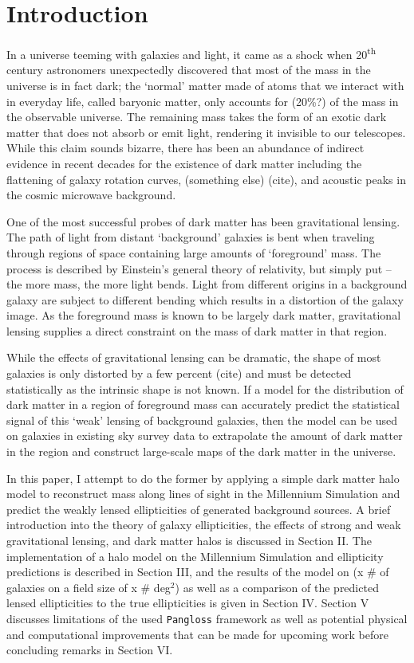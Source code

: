 \documentclass[%
 reprint,
 amsmath,amssymb,
 aps,
]{revtex4-1}
\begin{document}

\section{Introduction}

In a universe teeming with galaxies and light, it came as a shock when 20\textsuperscript{th} century astronomers unexpectedly discovered that most of the mass in the universe is in fact dark; the `normal' matter made of atoms that we interact with in everyday life, called baryonic matter, only accounts for (20\%?) of the mass in the observable universe. The remaining mass takes the form of an exotic dark matter that does not absorb or emit light, rendering it invisible to our telescopes. While this claim sounds bizarre, there has been an abundance of indirect evidence in recent decades for the existence of dark matter including the flattening of galaxy rotation curves\cite{rotation_curve}, (something else) (cite), and acoustic peaks in the cosmic microwave background\cite{planck_2015}.

One of the most successful probes of dark matter has been gravitational lensing. The path of light from distant `background' galaxies is bent when traveling through regions of space containing large amounts of `foreground' mass. The process is described by Einstein's general theory of relativity, but simply put -- the more mass, the more light bends. Light from different origins in a background galaxy are subject to different bending which results in a distortion of the galaxy image. As the foreground mass is known to be largely dark matter, gravitational lensing supplies a direct constraint on the mass of dark matter in that region.

While the effects of gravitational lensing can be dramatic, the shape of most galaxies is only distorted by a few percent (cite) and must be detected statistically as the intrinsic shape is not known. If a model for the distribution of dark matter in a region of foreground mass can accurately predict the statistical signal of this `weak' lensing of background galaxies, then the model can be used on galaxies in existing sky survey data to extrapolate the amount of dark matter in the region and construct large-scale maps of the dark matter in the universe.

In this paper, I attempt to do the former by applying a simple dark matter halo model to reconstruct mass along lines of sight in the Millennium Simulation and predict the weakly lensed ellipticities of generated background sources. A brief introduction into the theory of galaxy ellipticities, the effects of strong and weak gravitational lensing, and dark matter halos is discussed in Section II. The implementation of a halo model on the Millennium Simulation and ellipticity predictions is described in Section III, and the results of the model on (x \# of galaxies on a field size of x \# deg$^2$) as well as a comparison of the predicted lensed ellipticities to the true ellipticities is given in Section IV.  Section V discusses limitations of the used \texttt{Pangloss} framework as well as potential physical and computational improvements that can be made for upcoming work before concluding remarks in Section VI.
\end{document}
